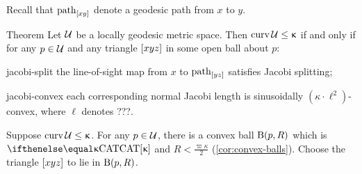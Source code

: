 Recall that $\mathrm{path}_{[xy]}$ denote a geodesic path from $x$ to $y$.





\begin{thm}{Theorem}\label{thm:jacobi-length}
Let $\mathcal{U}$ be a locally geodesic metric space. Then $\curv \spc{U}\le\kappa$ if and only if for any $p\in\spc{U}$ and any triangle $[{x}{y}{z}]$ in some open ball about $p$:



\begin{subthm}{jacobi-split} 
the line-of-sight map from $x$ to $\mathrm{path}_{[yz]}$
satisfies   Jacobi splitting;
\end{subthm}

\begin{subthm}{jacobi-convex}
each corresponding normal Jacobi length is  sinusoidally $(\kappa\cdot\ell^2)$-convex,
where $\ell$ denotes ???.
 \end{subthm}
\end {thm}

Suppose $\curv \spc{U}\le\kappa$. 
For any $p\in\spc{U}$, there is a convex ball 
$\mathrm{B}{}(p,R)$ which is $\CAT\kappa$ and $R<\tfrac{\varpi\kappa}{2}$ (\ref{cor:convex-balls}). 
Choose the triangle $[{x}{y}{z}]$ to lie in $\mathrm{B}{}(p,R)$.

 
